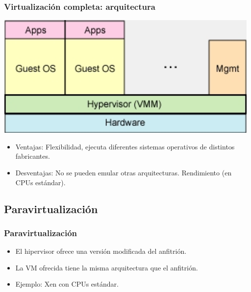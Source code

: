 \documentclass{beamer}
\begin{document}
\begin{frame}
\frametitle{Virtualización completa: arquitectura}
\begin{center}
\includegraphics[scale=0.35,clip=false]{figs/fullvirt.png}
\end{center}

\begin{itemize}
\item \alert{Ventajas:} Flexibilidad, ejecuta diferentes sistemas operativos de distintos fabricantes.
\item \alert{Desventajas:} No se pueden emular otras arquitecturas. Rendimiento (en CPUs estándar).
\end{itemize}

\end{frame}



\subsection{Paravirtualización}

\begin{frame}
\frametitle{Paravirtualización}

\begin{itemize}
\item El hipervisor ofrece una versión modificada del anfitrión.
\item La VM ofrecida tiene la misma arquitectura que el anfitrión.
\item \alert{Ejemplo:} Xen con CPUs estándar.
\end{itemize}
\end{frame}
\end{document}
